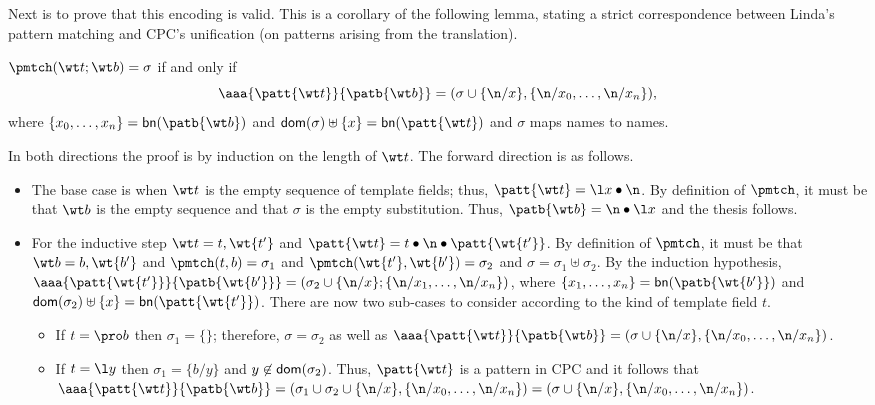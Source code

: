 \documentclass{LMCS}
\begin{document}
Next is  to prove that this encoding is valid. 
This is a corollary of the following lemma, stating a strict 
correspondence between Linda's pattern matching and CPC's unification
(on patterns arising from the translation).

\begin{lem}
\label{lem:twomatchs}
$\pmtch(\wt t;\wt b) = \sigma$ if and only if 
\[\aaa {\patt{\wt t}}
{\patb{\wt b}} = (\sigma \cup \{\n/x\}, \{\n/x_0,\ldots,\n/x_n\}),\]
where $\{x_0,\ldots,x_n\} = {\sf bn}(\patb{\wt b})$ and
${\sf dom}(\sigma) \uplus \{x\} = {\sf bn}(\patt{\wt t})$ 
and $\sigma$ maps names to names. 
\end{lem}
\proof
In both directions the proof is by induction on the length of $\wt t$.
The forward direction is as follows.
\begin{itemize}
	\item The base case is when $\wt t$ is the empty sequence of template fields;
				thus, $\patt{\wt t} = \l x \bullet \n$.
				By definition of $\pmtch$, it must be that $\wt b$ is the empty sequence
				and that $\sigma$ is the empty substitution.
				Thus, $\patb{\wt b} = \n \bullet \l x$ and the thesis follows.
	\item For the inductive step $\wt t= t,\wt{t'}$ and $\patt{\wt t} = t \bullet \n \bullet \patt{\wt{t'}}$.
				By definition of $\pmtch$, it must be that $\wt b = b, \wt{b'}$ and $\pmtch(t,b) = \sigma_1$ and
				$\pmtch(\wt{t'},\wt{b'}) = \sigma_2$ and $\sigma = \sigma_1 \uplus \sigma_2$.
				By the induction hypothesis, $\aaa {\patt{\wt {t'}}} {\patb{\wt {b'}}} = 
				(\sigma_2 \cup \{\n/x\} ; \{\n/x_1,\ldots,\n/x_n\})$,
				where $\{x_1,\ldots,x_n\} = {\sf bn}(\patb{\wt {b'}})$
				and ${\sf dom}(\sigma_2) \uplus \{x\} = {\sf bn}(\patt{\wt {t'}})$.
				There are now two sub-cases to consider according to the kind of template field $t$.
				\begin{itemize}
					\item If $t = \pro b$ then $\sigma_1 = \{\}$; therefore,
								$\sigma
                                          = \sigma_2$ as well as
								$\aaa {\patt{\wt t}} {\patb{\wt b}} = 
								(\sigma\cup \{\n/x\}, \{\n/x_0,\ldots,\n/x_n\})$.
					\item If $t = \l y$ then $\sigma_1 = \{b/y\}$ and $y \not\in {\sf dom}(\sigma_2)$.
								Thus, $\patt{\wt t}$ is a pattern in CPC and it follows that
								$\aaa {\patt{\wt t}} {\patb{\wt b}} =
								(\sigma_1\cup\sigma_2\cup \{\n/x\}, \{\n/x_0,\ldots,\n/x_n\}) =
								(\sigma \cup \{\n/x\}, \{\n/x_0,\ldots,\n/x_n\})$.
				\end{itemize}
\end{itemize}
\end{document}
